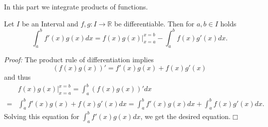 

In this part we integrate products of functions.

\begin{Theorem}
Let $I$ be an Interval and $f,g:I\to\mathbb{R}$ be differentiable. Then for $a,b\in I$ holds
\[\int_a^bf'(x)g(x)dx=\left.f(x)g(x)\right|_{x=a}^{x=b}-\int_a^bf(x)g'(x)dx.\]
\end{Theorem}
\whiteskip
{\em Proof:} The product rule of differentiation implies
\[(f(x)g(x))'=f'(x)g(x)+f(x)g'(x)\]
and thus
\[\begin{aligned}
&\left.f(x)g(x)\right|_{x=a}^{x=b}=\int_a^b(f(x)g(x))'dx\\=&\int_a^bf'(x)g(x)+f(x)g'(x)dx=
\int_a^bf'(x)g(x)dx+\int_a^bf(x)g'(x)dx.\end{aligned}
\]
Solving this equation for $\int_a^bf'(x)g(x)dx$, we get the desired equation.\hfill$\Box$
\whiteskip
